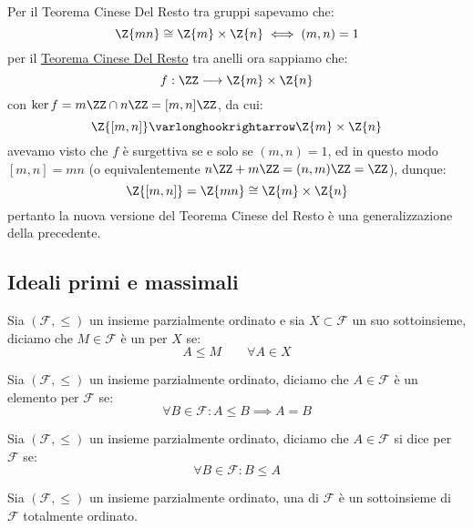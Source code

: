 \documentclass[11pt]{scrartcl}
\begin{document}
\begin{remark}
    Per il Teorema Cinese Del Resto tra gruppi sapevamo che:
        \[ \Z{mn} \cong \Z{m} \times \Z{n} \iff (m,n) = 1
            \]
    per il \hyperref[t:cinese]{Teorema Cinese Del Resto} tra anelli ora sappiamo che:
        \[ f: \ZZ \longrightarrow \Z{m} \times \Z{n}
            \]
    con $\ker f = m\ZZ \cap n\ZZ = [m,n]\ZZ$, da cui:
        \[ \Z{[m,n]} \varlonghookrightarrow \Z{m} \times \Z{n}
            \]
    avevamo visto che $f$ è surgettiva se e solo se $(m,n) = 1$, ed in questo modo $[m,n] = mn$ (o equivalentemente $n\ZZ + m\ZZ = (n,m)\ZZ = \ZZ$), dunque:
        \[ \Z{[m,n]} = \Z{mn} \cong \Z{m} \times \Z{n}
            \]
    pertanto la nuova versione del Teorema Cinese del Resto è una generalizzazione della precedente.
\end{remark}

\newpage
\subsection{Ideali primi e massimali}

\begin{definition}
    Sia $(\mathcal{F}, \leqslant)$ un insieme parzialmente ordinato e sia $X \subset \mathcal{F}$ un suo sottoinsieme, diciamo che 
    $M \in \mathcal{F}$ è un  per $X$ se:
        \[ A \leqslant M \qquad \forall A \in X
            \]
\end{definition}

\begin{definition}
    Sia $(\mathcal{F}, \leqslant)$ un insieme parzialmente ordinato, diciamo che 
    $A \in \mathcal{F}$ è un elemento  per $\mathcal{F}$ se:
        \[ \forall B \in \mathcal{F} : A \leqslant B \implies A = B
            \]
\end{definition}

\begin{definition}
    Sia $(\mathcal{F}, \leqslant)$ un insieme parzialmente ordinato, diciamo che 
    $A \in \mathcal{F}$ si dice  per $\mathcal{F}$ se:
    \[ \forall B \in \mathcal{F} : B \leqslant A
        \]
\end{definition}

\begin{definition}
    Sia $(\mathcal{F}, \leqslant)$ un insieme parzialmente ordinato, una  di $\mathcal{F}$ è un sottoinsieme di $\mathcal{F}$ totalmente 
    ordinato.
\end{definition}
\end{document}
